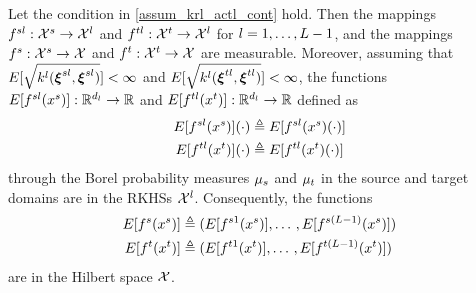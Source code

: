 \documentclass[review,supplement,onefignum,onetabnum]{siamonline250211}
\begin{document}
\begin{lemma}
\label{lem_fs_ft_measble}
Let the condition in \cref{assum_krl_actl_cont} hold. Then the mappings $f^{sl}: \mathcal{X}^s \rightarrow \mathcal{X}^l$ and $f^{tl}:  \mathcal{X}^t \rightarrow \mathcal{X}^l$ for $l=1, \dots, L-1$, and the mappings $f^s:  \mathcal{X}^s \rightarrow \mathcal{X} $ and $f^t:  \mathcal{X}^t \rightarrow \mathcal{X} $ are measurable. Moreover, assuming that $E[\sqrt{k^l(\boldsymbol{\xi}^{sl}, \boldsymbol{\xi}^{sl})}]<\infty$ and $E[\sqrt{k^l(\boldsymbol{\xi}^{tl}, \boldsymbol{\xi}^{tl})}]<\infty$, the functions $E[f^{sl}(x^s)]: \mathbb{R}^{d_l} \rightarrow \mathbb{R}$ and $E[f^{tl}(x^t)]: \mathbb{R}^{d_l} \rightarrow \mathbb{R}$ defined as
%
\begin{equation*}
\begin{split}
E[f^{sl}(x^s)](\cdot) & \triangleq E[f^{sl}(x^s)(\cdot)] \\
E[f^{tl}(x^t)](\cdot) & \triangleq E[f^{tl}(x^t)(\cdot)] 
\end{split}
\end{equation*}
%
through the Borel probability measures $\mu_s$ and $\mu_t$ in the source and target domains  are in the RKHSs $\mathcal{X}^l$. Consequently, the functions 
\begin{equation*}
\begin{split}
    E[f^s(x^s)]& \triangleq ( E[f^{s1} (x^s)], \dots \, , E[f^{s(L-1)}(x^s)]    )  \\ 
    E[f^t(x^t)]& \triangleq ( E[f^{t1} (x^t)], \dots \, , E[f^{t(L-1)}(x^t)]    ) 
\end{split}
\end{equation*}
are in  the Hilbert space $\mathcal{X}$.
\end{lemma}
\end{document}
